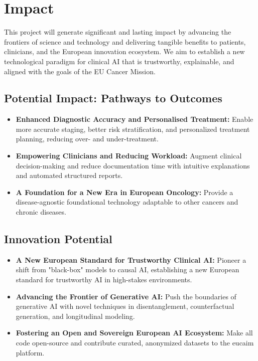 \documentclass[11pt, a4paper]{article}
\begin{document}
\section{Impact}
This project will generate significant and lasting impact by advancing the frontiers of science and technology and delivering tangible benefits to patients, clinicians, and the European innovation ecosystem. We aim to establish a new technological paradigm for clinical AI that is trustworthy, explainable, and aligned with the goals of the EU Cancer Mission.

\subsection{Potential Impact: Pathways to Outcomes}
\begin{itemize}
    \item \textbf{Enhanced Diagnostic Accuracy and Personalised Treatment:} Enable more accurate staging, better risk stratification, and personalized treatment planning, reducing over- and under-treatment.
    \item \textbf{Empowering Clinicians and Reducing Workload:} Augment clinical decision-making and reduce documentation time with intuitive explanations and automated structured reports.
    \item \textbf{A Foundation for a New Era in European Oncology:} Provide a disease-agnostic foundational technology adaptable to other cancers and chronic diseases.
\end{itemize}

\subsection{Innovation Potential}
\begin{itemize}
    \item \textbf{A New European Standard for Trustworthy Clinical AI:} Pioneer a shift from "black-box" models to causal AI, establishing a new European standard for trustworthy AI in high-stakes environments.
    \item \textbf{Advancing the Frontier of Generative AI:} Push the boundaries of generative AI with novel techniques in disentanglement, counterfactual generation, and longitudinal modeling.
    \item \textbf{Fostering an Open and Sovereign European AI Ecosystem:} Make all code open-source and contribute curated, anonymized datasets to the \gls{eucaim} platform.
\end{itemize}
\end{document}
